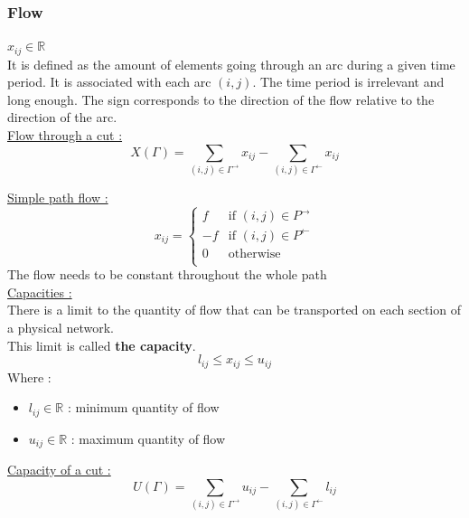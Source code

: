 \documentclass[../main.tex]{subfiles}
\begin{document}
\subsubsection{Flow}
$x_{ij} \in \mathbb{R}$\\
It is defined as the amount of elements going through an arc during a given time period. It is associated with each arc $(i,j)$. The time period is irrelevant and long enough. The sign corresponds to the direction of the flow relative to the direction of the arc.\\

\quad \underline{Flow through a cut :}\\
\begin{equation}
    X(\Gamma) = \sum_{(i,j) \in \Gamma^\rightarrow} x_{ij} - \sum_{(i,j)\in \Gamma^\leftarrow} x_{ij}
\end{equation}

\quad \underline{Simple path flow :}\\
\begin{equation}
    x_{ij} = \begin{cases}
        f & \text{if }(i,j) \in P^\rightarrow\\
        -f & \text{if }(i,j) \in P^\leftarrow\\
        0 & \text{otherwise}\\
    \end{cases}
\end{equation}
\warning The flow needs to be constant throughout the whole path\\

\quad \underline{Capacities :}\\
There is a limit to the quantity of flow that can be transported on each section of a physical network.\\ This limit is called \textbf{the capacity}.\\

\begin{equation}
    l_{ij} \leq x_{ij} \leq u_{ij}
\end{equation}
Where : \begin{itemize}
    \item $l_{ij} \in \mathbb{R}$ : minimum quantity of flow\\
    \item $u_{ij} \in \mathbb{R}$ : maximum quantity of flow\\
\end{itemize}

\quad \underline{Capacity of a cut :}\\
\begin{equation}
    U(\Gamma) = \sum_{(i,j) \in \Gamma^\rightarrow} u_{ij} - \sum_{(i,j)\in \Gamma^\leftarrow}l_{ij}
\end{equation}
\end{document}
